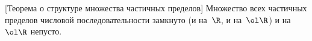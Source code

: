 [Теорема о структуре множества частичных пределов]
Множество всех частичных пределов числовой последовательности замкнуто
(и на~$\R$, и на~$\ol\R$) и на~$\ol\R$ непусто.

